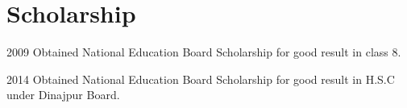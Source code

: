 \documentclass[a4paper]{article}
\begin{document}




\section{Scholarship}

\begin{CV}
\item[2009] Obtained National Education Board Scholarship for good result in class 8.
\item[2014] Obtained National Education Board Scholarship for good result in H.S.C under Dinajpur Board.
\end{CV}

\end{document}
